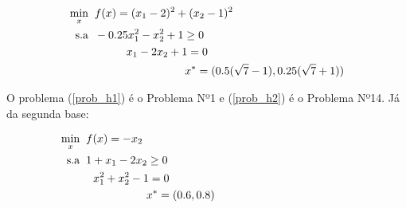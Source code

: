 \begin{subequations}
  \label{prob_h2}
  \begin{align}
    \hspace{0pt}\hfill \underset{x}{\text{min}} \hspace{0.2cm} & f(x) =   (x_1 - 2)^2 + (x_2-1)^2 \\
    \hspace{0pt}\hfill \text{s.a} \hspace{0.2cm} & -0.25x_1^2 - x_2^2 + 1 \geq 0 \\
    \hspace{0pt}\hfill & \hspace{1cm} x_1 - 2x_2 + 1 = 0 \\
    \hspace{0pt}\hfill & \hspace{2.85cm} x^* = (0.5(\sqrt{7}-1), 0.25(\sqrt{7}+1))
  \end{align}
\end{subequations}








O problema (\ref{prob_h1}) é o Problema Nº1 e (\ref{prob_h2}) é o Problema Nº14.
Já da segunda base:

\begin{subequations}
  \label{prob_s1}
  \begin{align}
    \hspace{0pt}\hfill \underset{x}{\text{min}} \hspace{0.2cm} & f(x) = -x_2 \hspace{4.35cm} \\
    \hspace{0pt}\hfill \text{s.a} \hspace{0.2cm} &  1 + x_1 - 2x_2 \geq 0 \hspace{4.35cm} \\
    \hspace{0pt}\hfill & \hspace{0.225cm}  x_1^2 + x_2^2 - 1 = 0 \hspace{4.35cm} \\
    \hspace{0pt}\hfill & \hspace{1.9cm} x^* = (0.6, 0.8) \hspace{4.35cm}
  \end{align}
\end{subequations}

